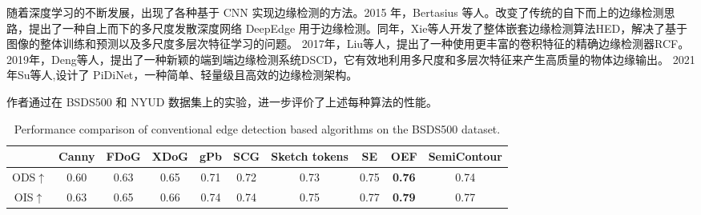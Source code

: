 \documentclass[a4paper, 10pt]{article}
\begin{document}
			随着深度学习的不断发展，出现了各种基于 CNN 实现边缘检测的方法。2015 年，Bertasius 等人。改变了传统的自下而上的边缘检测思路，提出了一种自上而下的多尺度发散深度网络 DeepEdge \cite{bertasius2015high} 用于边缘检测。同年，Xie等人开发了整体嵌套边缘检测算法HED\cite{xie2015holistically}，解决了基于图像的整体训练和预测以及多尺度多层次特征学习的问题。 2017年，Liu等人，提出了一种使用更丰富的卷积特征的精确边缘检测器RCF\cite{liu2017richer}。 2019年，Deng等人，提出了一种新颖的端到端边缘检测系统DSCD\cite{deng2020deep}，它有效地利用多尺度和多层次特征来产生高质量的物体边缘输出。 2021年Su等人,设计了 PiDiNet\cite{su2021pixel}，一种简单、轻量级且高效的边缘检测架构。
			
			作者通过在 BSDS500 和 NYUD 数据集上的实验，进一步评价了上述每种算法的性能。
			
			\begin{table}[!htbp]
				\centering
				\tiny
					\begin{tabular}{c|c|c|c|c|c|c|c|c|c}
						
						\hline
						
						\textbf{} & \textbf{Canny} & \textbf{FDoG} & \textbf{XDoG} & \textbf{gPb} & \textbf{SCG} &  \textbf{Sketch tokens} & \textbf{SE} & \textbf{OEF} & \textbf{SemiContour} \\
						
						\hline
						
						ODS$\uparrow$ & 0.60 & 0.63 & 0.65 & 0.71 & 0.72 & 0.73 & 0.75 & \textbf{0.76} & 0.74 \\
						
						OIS$\uparrow$ & 0.63 & 0.65 & 0.66 & 0.74 & 0.74 & 0.75 & 0.77 & \textbf{0.79} & 0.77 \\
						
						\hline
						
					\end{tabular}
				\captionsetup{font=scriptsize} 
				\caption{\label{tab: Algorithms on the BSDS500 dataset}
					Performance comparison of conventional edge detection based algorithms on the BSDS500 dataset.} 
			\end{table}
			
\end{document}
